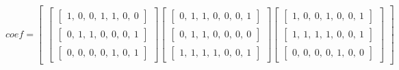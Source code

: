 \begin{equation}\label{eq:ej-coef}
{coef} =
	\left[\begin{array}{c}
		\left[\begin{array}{c}
			\left[\begin{array}{c}1,\ 0,\ 0,\ 1,\ 1,\ 0,\ 0\end{array}\right]\\
			\left[\begin{array}{c}0,\ 1,\ 1,\ 0,\ 0,\ 0,\ 1\end{array}\right]\\
			\left[\begin{array}{c}0,\ 0,\ 0,\ 0,\ 1,\ 0,\ 1\end{array}\right]
		\end{array}\right]
		\left[\begin{array}{c}
			\left[\begin{array}{c}0,\ 1,\ 1,\ 0,\ 0,\ 0,\ 1\end{array}\right]\\
			\left[\begin{array}{c}0,\ 1,\ 1,\ 0,\ 0,\ 0,\ 0\end{array}\right]\\
			\left[\begin{array}{c}1,\ 1,\ 1,\ 1,\ 0,\ 0,\ 1\end{array}\right]
		\end{array}\right]
		\left[\begin{array}{c}
			\left[\begin{array}{c}1,\ 0,\ 0,\ 1,\ 0,\ 0,\ 1\end{array}\right]\\
			\left[\begin{array}{c}1,\ 1,\ 1,\ 1,\ 0,\ 0,\ 1\end{array}\right]\\
			\left[\begin{array}{c}0,\ 0,\ 0,\ 0,\ 1,\ 0,\ 0\end{array}\right]
		\end{array}\right]
	\end{array}\right]
\end{equation}




